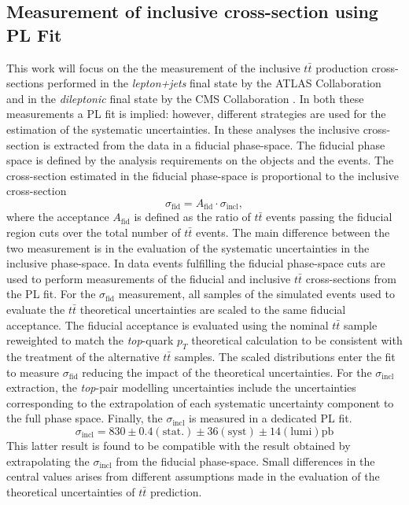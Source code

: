 \documentclass[12pt]{article}
\begin{document}
\subsection{Measurement of inclusive cross-section using PL Fit}
This work will focus on the the measurement of the inclusive $t\bar{t}$ production cross-sections performed in the \emph{lepton+jets} final state by the ATLAS Collaboration \cite{Aad_2020} and in the \emph{dileptonic} final state by the CMS Collaboration \cite{CMS_inclusive}. In both these measurements a PL fit is implied: however, different strategies are used for the estimation of the systematic uncertainties. 
In these analyses the inclusive cross-section is extracted from the data in a fiducial phase-space. The fiducial phase space is defined by the analysis requirements on the objects and the events. The cross-section estimated in the fiducial phase-space is proportional to the inclusive cross-section
\begin{equation}
\sigma_{\mathrm{fid}} = A_{\mathrm{fid}} \cdot \sigma_{\mathrm{incl}}, 
\end{equation}
where the acceptance $A_{\mathrm{fid}}$ is defined as the ratio of $t\bar{t}$ events passing the fiducial region cuts over the total number of $t\bar{t}$ events.
The main difference between the two measurement is in the evaluation of the systematic uncertainties in the inclusive phase-space. 
In \cite{Aad_2020} data events fulfilling the fiducial phase-space cuts are used to perform measurements of the fiducial and inclusive $t\bar{t}$ cross-sections from the PL fit. For the $\sigma_{\mathrm{fid}}$ measurement, all samples of the simulated events used to evaluate the $t\bar{t}$ theoretical uncertainties are scaled to the same fiducial acceptance. 
The fiducial acceptance is evaluated using the nominal $t\bar{t}$ sample reweighted to match the \emph{top}-quark $p_T$ theoretical calculation to be consistent with the treatment of the alternative $t\bar{t}$ samples. The scaled distributions enter the fit to measure $\sigma_{\mathrm{fid}}$ reducing the impact of the theoretical uncertainties. For the $\sigma_{\mathrm{incl}}$ extraction, the \emph{top}-pair modelling uncertainties include the uncertainties corresponding to the extrapolation of each systematic uncertainty component to the full phase space. 
Finally, the $\sigma_{\mathrm{incl}}$ is measured in a dedicated PL fit. 
\begin{equation}
\sigma_{\mathrm{incl}} = 830\pm0.4(\mathrm{stat.})\pm36(\mathrm{syst})\pm14(\mathrm{lumi})\mathrm{pb}
\end{equation}
This latter result is found to be compatible with the result obtained by extrapolating the $\sigma_{\mathrm{incl}}$ from the fiducial phase-space. Small differences in the central values arises from different assumptions made in the evaluation of the theoretical uncertainties of $t\bar{t}$ prediction.
\end{document}

